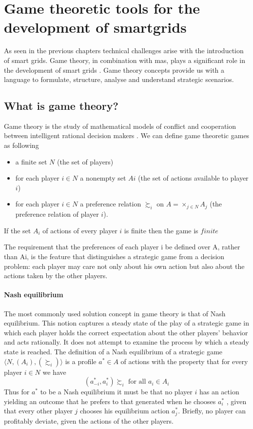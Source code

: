\section{Game theoretic tools for the development of smartgrids}
As seen in the previous chapters technical challenges arise with the introduction of smart grids. Game theory, in combination with \gls{mas}, plays a significant role in the development of smart grids \cite{keypaper}. Game theory concepts provide us with a language to formulate, structure, analyse and understand strategic scenarios.

\subsection{What is game theory?}

Game theory is the study of mathematical models of conflict and cooperation between intelligent rational decision makers \cite{myerson2013game}. 
We can define game theoretic games as following
\begin{itemize}
    \item a finite set $N$ (the set of players)
    \item for each player $i \in N$ a nonempty set $Ai$ (the set of actions available to player $i$)
    \item for each player $i \in N$ a preference relation $\succsim_i$ on $A = \times_{j \in N}A_j$ (the preference relation of player $i$).
\end{itemize}
If the set $A_i$ of actions of every player $i$ is finite then the game is $finite$

The requirement that the preferences of each player i be defined over A, rather than Ai, is the feature that distinguishes a strategic game from a decision problem: each player may care not only about his own action but also about the actions taken by the other players. \cite{CourseInGameTheory}


\paragraph{Nash equilibrium} 
The most commonly used solution concept in game theory is that of Nash equilibrium. This notion captures a steady state of the play of a strategic game in which each player holds the correct expectation about the other players’ behavior and acts rationally. It does not attempt to examine the process by which a steady state is reached.
The definition of a Nash equilibrium of a strategic game $\langle N, (A_i), (\succsim_i) \rangle $ is a profile $a^{*} \in A$ of actions with the property that for every player $i \in N$ we have $$(a^{*}_{-i}, a^{*}_{i}) \succsim_i \text{ for all } a_i \in A_i$$
Thus for $a^*$ to be a Nash equilibrium it must be that no player $i$ has an action yielding an outcome that he prefers to that generated when he chooses $a_i^*$ , given that every other player $j$ chooses his equilibrium action $a^*_j$. Briefly, no player can profitably deviate, given the actions of the other players. \cite{CourseInGameTheory}

